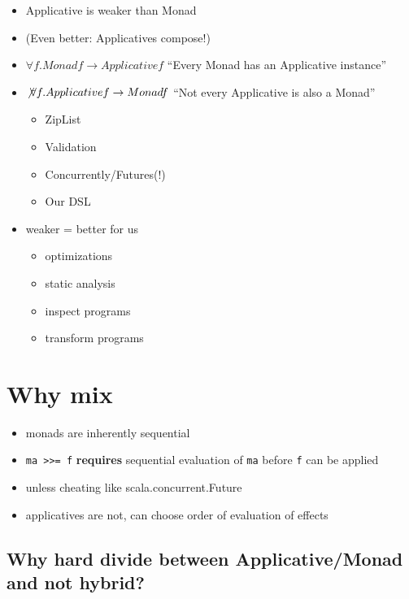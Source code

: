 \begin{itemize}
\item Applicative is weaker than Monad
\item (Even better: Applicatives compose!)
\item $\forall f. Monad f \rightarrow Applicative f$
  ``Every Monad has an Applicative instance''
\item $\not \forall f. Applicative f \rightarrow Monad f$
  ``Not every Applicative is also a Monad''
  \begin{itemize}
  \item ZipList
  \item Validation
  \item Concurrently/Futures(!)
  \item Our DSL
  \end{itemize}
\item weaker = better for us
  \begin{itemize}
  \item optimizations
  \item static analysis
  \item inspect programs
  \item transform programs
  \end{itemize}
\end{itemize}

\section{Why mix}
\label{sec:why-mix}

\begin{itemize}
\item monads are inherently sequential
\item \texttt{ma >>= f} \textbf{requires} sequential evaluation of \texttt{ma}
  before \texttt{f} can be applied
\item unless cheating like scala.concurrent.Future
\item applicatives are not, can choose order of evaluation of effects
\end{itemize}

\subsection{Why hard divide between Applicative/Monad and not hybrid?}
\label{sec:why-hard-divide}

